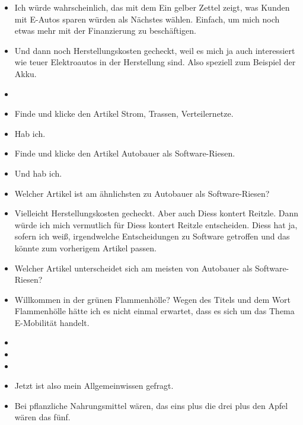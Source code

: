{\begin{itemize}[]
            \item {} Ich würde wahrscheinlich, das mit dem \flqq Ein gelber Zettel zeigt, was Kunden mit E-Autos sparen würden\frqq{} als Nächstes wählen.
                  Einfach, um mich noch etwas mehr mit der Finanzierung zu beschäftigen.
            \item {} Und dann noch \flqq Herstellungskosten\frqq{} gecheckt, weil es mich ja auch interessiert wie teuer Elektroautos in der Herstellung sind.
                  Also speziell zum Beispiel der Akku.
            \item {}
            \item {} Finde und klicke den Artikel \flqq Strom, Trassen, Verteilernetze\frqq{}.
            \item {} Hab ich.
            \item {} Finde und klicke den Artikel \flqq Autobauer als Software-Riesen\frqq{}.
            \item {} Und hab ich.
            \item {} Welcher Artikel ist am ähnlichsten zu \flqq Autobauer als Software-Riesen\frqq{}?
            \item {} Vielleicht \flqq Herstellungskosten gecheckt\frqq{}.
                  Aber auch \flqq Diess kontert Reitzle\frqq{}.
                  Dann würde ich mich vermutlich für \flqq Diess kontert Reitzle\frqq{} entscheiden.
                  Diess hat ja, sofern ich weiß, irgendwelche Entscheidungen zu Software getroffen und das könnte zum vorherigem Artikel passen.
            \item {} Welcher Artikel unterscheidet sich am meisten von \flqq Autobauer als Software-Riesen\frqq{}?
            \item {} \flqq Willkommen in der grünen Flammenhölle\frqq{}?
                  Wegen des Titels und dem Wort Flammenhölle hätte ich es nicht einmal erwartet, dass es sich um das Thema E-Mobilität handelt.
            \item {}
            \item {}
            \item {}
            \item {} Jetzt ist also mein Allgemeinwissen gefragt.
            \item {} Bei pflanzliche Nahrungsmittel wären, das eins plus die drei plus den Apfel wären das fünf.

\end{itemize}}
